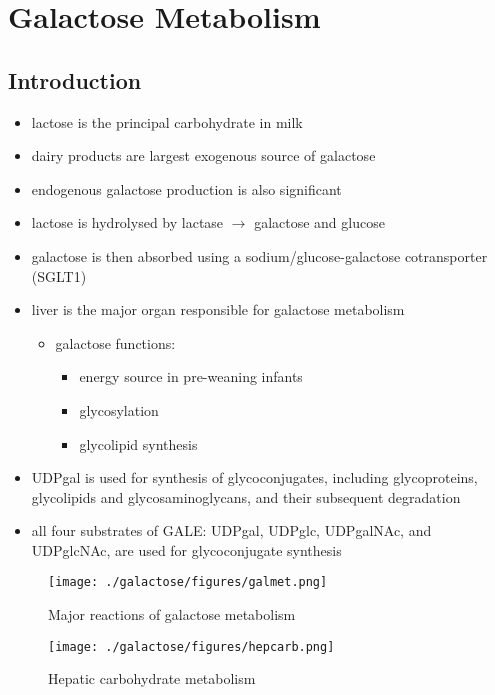 \documentclass{scrartcl}
\begin{document}
\section{Galactose Metabolism}
\label{sec:org1d7ad0b}
\subsection{Introduction}
\label{sec:orge16cc71}
\begin{itemize}
\item lactose is the principal carbohydrate in milk
\item dairy products are largest exogenous source of galactose
\item endogenous galactose production is also significant
\item lactose is hydrolysed by lactase \(\to\) galactose and glucose
\item galactose is then absorbed using a sodium/glucose-galactose cotransporter (SGLT1)
\item liver is the major organ responsible for galactose metabolism
\begin{itemize}
\item galactose functions:
\begin{itemize}
\item energy source in pre-weaning infants
\item glycosylation
\item glycolipid synthesis
\end{itemize}
\end{itemize}

\item UDPgal is used for synthesis of glycoconjugates, including
glycoproteins, glycolipids and glycosaminoglycans, and their
subsequent degradation
\item all four substrates of GALE: UDPgal, UDPglc, UDPgalNAc, and
UDPglcNAc, are used for glycoconjugate synthesis
\end{itemize}


\begin{figure}[htbp]
\centering
\texttt{[image: ./galactose/figures/galmet.png]}
\caption{\label{fig:orgb3b69ee}
Major reactions of galactose metabolism}
\end{figure}


\begin{figure}[htbp]
\centering
\texttt{[image: ./galactose/figures/hepcarb.png]}
\caption{\label{fig:orge48c2a0}
Hepatic carbohydrate metabolism}
\end{figure}
\end{document}
